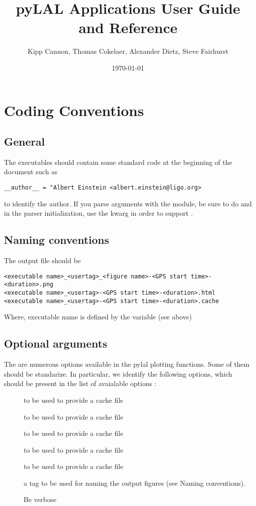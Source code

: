 \documentclass{book}
\title{pyLAL Applications User Guide and Reference}
\author{Kipp Cannon, Thomas Cokelaer, Alexander Dietz, Steve Fairhurst}
\date{\today}
\begin{document}
\maketitle
\tableofcontents
\listoftables
\listoffigures
\chapter{Coding Conventions}
\section{General}
The executables should contain some standard code at the beginning of the
document such as
%
\begin{verbatim}
__author__ = "Albert Einstein <albert.einstein@ligo.org>
\end{verbatim}
to identify the author. If you parse arguments with the 
module, be sure to do  and in the
parser initialization, use the kwarg
 in order to support
.

\section{Naming conventions}
The output file should be 
\begin{verbatim}
<executable name>_<usertag>_<figure name>-<GPS start time>-<duration>.png
<executable name>_<usertag>-<GPS start time>-<duration>.html
<executable name>_<usertag>-<GPS start time>-<duration>.cache
\end{verbatim}
Where, executable name is defined by the variable  (see above)


\section{Optional arguments}
The are numerous options available in the pylal plotting functions. Some of
them should be standarize. In particular, we identify the following options,
which should be present in the list of avaialable options :

\begin{description}
\item[] to be used to provide a cache file
\item[] to be used to provide a cache file
\item[] to be used to provide a cache file
\item[] to be used to provide a cache file
\item[] to be used to provide a cache file
\item[] a tag to be used for naming the output figures
(see Naming conventions).
\item[] Be verbose
\end{description}
\end{document}
